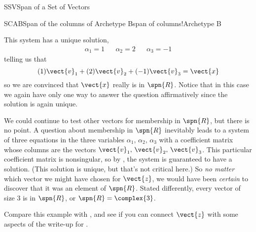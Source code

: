 \begin{subsect}{SSV}{Span of a Set of Vectors}
\begin{example}{SCAB}{Span of the columns of Archetype B}{span of columns!Archetype B}
\begin{para}
\end{para}
%
\begin{para}This system has a unique solution,
\begin{align*}
\alpha_1 = 1&&\alpha_2 = 2&&\alpha_3 = -1
\end{align*}
%
telling us that
%
\begin{equation*}
(1)\vect{v}_1+(2)\vect{v}_2+(-1)\vect{v}_3=\vect{x}
\end{equation*}
%
so we are convinced that $\vect{x}$ really is in $\spn{R}$.  Notice that in this case we again have only one way to answer the question affirmatively since the solution is again unique.\end{para}
%
\begin{para}We could continue to test other vectors for membership in $\spn{R}$, but there is no point.   A question about membership in $\spn{R}$ inevitably leads to a system of three equations in the three variables $\alpha_1,\,\alpha_2,\,\alpha_3$ with a coefficient matrix whose columns are the vectors $\vect{v}_1,\,\vect{v}_2,\,\vect{v}_3$.  This particular coefficient matrix is nonsingular, so by , the system is guaranteed to have a solution.  (This solution is unique, but that's not critical here.)  So {\em no matter} which vector we might have chosen for $\vect{z}$, we would have been {\em certain} to discover that it was an element of $\spn{R}$.  Stated differently, every vector of size 3 is in $\spn{R}$, or $\spn{R}=\complex{3}$.\end{para}
%
\begin{para}Compare this example with , and see if you can connect $\vect{z}$ with some aspects of the write-up for .\end{para}
%
\end{example}
%
%
%
\end{subsect}
%
